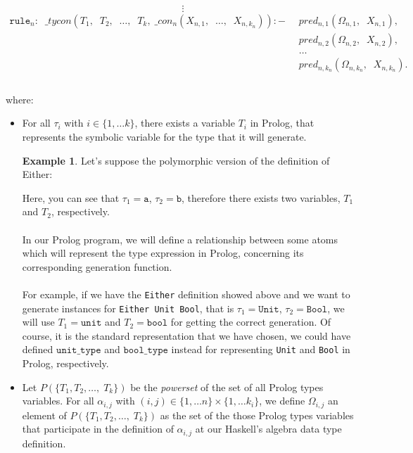 \documentclass{report}
\theoremstyle{definition}
\newtheorem{example}{Example}[section]
\theoremstyle{definition}
\newcommand{\ttt}[1]{\texttt{#1}}
\newcommand{\tav}{\;\;}
\begin{document}
	$$\vdots$$
	\begin{align*}
		\ttt{rule}_n: \tav \_ tycon (T_1, \tav T_2, \tav \ldots, \tav T_k, \; \_ con_n(X_{n,1}, \tav \ldots, \tav X_{n,k_n})) :-&
		\tav pred_{n, 1}(\Omega_{n,1}, \tav X_{n,1}), && \\
		  & \tav pred_{n, 2}(\Omega_{n,2}, \tav X_{n,2}),       &   &   \\
		  & \tav \ldots \tav                                    &   &   \\
		  & \tav pred_{n, k_n}(\Omega_{n,k_n}, \tav X_{n,k_n}). &   &   \\
	\end{align*}\\
	where:
	\begin{itemize}
		\item For all $\tau_i$ with $i \in \{1, \ldots k \}$, there exists a variable $T_i$ in Prolog, that represents the symbolic variable for the type that it will generate.
		      \begin{example}
		      	Let's suppose the polymorphic version of the definition of Either:
		      	
		      	Here, you can see that $\tau_1 = \ttt{a}$, $\tau_2 = \ttt{b}$, therefore there exists two variables, $T_1$ and $T_2$, respectively.\\\\
		      	In our Prolog program, we will define a relationship between some atoms which will represent the type expression in Prolog, concerning its corresponding generation function.\\\\
		      	For example, if we have the \ttt{Either} definition showed above and we want to generate instances for \ttt{Either Unit Bool}, that is $\tau_1 = \ttt{Unit}$, $\tau_2 = \ttt{Bool}$, we will use $T_1 = \ttt{unit}$ and $T_2 = \ttt{bool}$ for getting the correct generation. Of course, it is the standard representation that we have chosen, we could have defined $\ttt{unit\_type}$ and $\ttt{bool\_type}$ instead for representing \ttt{Unit} and \ttt{Bool} in Prolog, respectively.
		      \end{example}
		\item Let $P(\{ T_1 , T_2, \ldots, \; T_k \})$ be the \textit{powerset} of the set of all Prolog types variables. For all $\alpha_{i,j}$ with $(i,j) \in \{1, \ldots n \} \times \{1, \ldots k_i \}$, we define $\Omega_{i,j}$ an element of $P(\{ T_1, T_2, \ldots, \; T_k \})$ as the set of the those Prolog types variables that participate in the definition of $\alpha_{i,j}$ at our Haskell's algebra data type definition.

\end{itemize}
\end{document}
